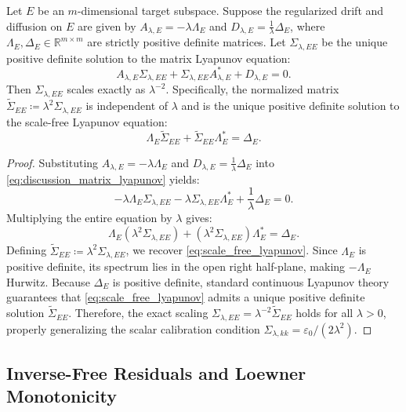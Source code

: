 \begin{theorem}
  \label{thm:matrix_lyapunov}
  Let $E$ be an $m$-dimensional target subspace. Suppose the regularized drift and diffusion on $E$ are given by $A_{\lambda,E} = -\lambda \Lambda_E$ and $D_{\lambda,E} = \frac{1}{\lambda} \Delta_E$, where $\Lambda_E, \Delta_E \in \mathbb{R}^{m \times m}$ are strictly positive definite matrices. Let $\Sigma_{\lambda,EE}$ be the unique positive definite solution to the matrix Lyapunov equation:
  \begin{equation}
    \label{eq:discussion_matrix_lyapunov}
    A_{\lambda,E}\Sigma_{\lambda,EE}
    +\Sigma_{\lambda,EE}A_{\lambda,E}^{*}
    +D_{\lambda,E}=0.
  \end{equation}
  Then $\Sigma_{\lambda,EE}$ scales exactly as $\lambda^{-2}$. Specifically, the normalized matrix $\widetilde{\Sigma}_{EE} \coloneqq \lambda^2 \Sigma_{\lambda,EE}$ is independent of $\lambda$ and is the unique positive definite solution to the scale-free Lyapunov equation:
  \begin{equation}
    \label{eq:scale_free_lyapunov}
    \Lambda_E \widetilde{\Sigma}_{EE} + \widetilde{\Sigma}_{EE} \Lambda_E^* = \Delta_E.
  \end{equation}
\end{theorem}
\begin{proof}
  Substituting $A_{\lambda,E} = -\lambda \Lambda_E$ and $D_{\lambda,E} = \frac{1}{\lambda} \Delta_E$ into \eqref{eq:discussion_matrix_lyapunov} yields:
  \[
    -\lambda \Lambda_E \Sigma_{\lambda,EE} - \lambda \Sigma_{\lambda,EE} \Lambda_E^* + \frac{1}{\lambda} \Delta_E = 0.
  \]
  Multiplying the entire equation by $\lambda$ gives:
  \[
    \Lambda_E (\lambda^2 \Sigma_{\lambda,EE}) + (\lambda^2 \Sigma_{\lambda,EE}) \Lambda_E^* = \Delta_E.
  \]
  Defining $\widetilde{\Sigma}_{EE} \coloneqq \lambda^2 \Sigma_{\lambda,EE}$, we recover \eqref{eq:scale_free_lyapunov}. Since $\Lambda_E$ is positive definite, its spectrum lies in the open right half-plane, making $-\Lambda_E$ Hurwitz. Because $\Delta_E$ is positive definite, standard continuous Lyapunov theory guarantees that \eqref{eq:scale_free_lyapunov} admits a unique positive definite solution $\widetilde{\Sigma}_{EE}$. Therefore, the exact scaling $\Sigma_{\lambda,EE} = \lambda^{-2} \widetilde{\Sigma}_{EE}$ holds for all $\lambda > 0$, properly generalizing the scalar calibration condition $\Sigma_{\lambda,kk} = \varepsilon_0 / (2\lambda^2)$.
\end{proof}

\subsection{Inverse-Free Residuals and Loewner Monotonicity}
\label{sec:discussion:operator-valued-residuals}

